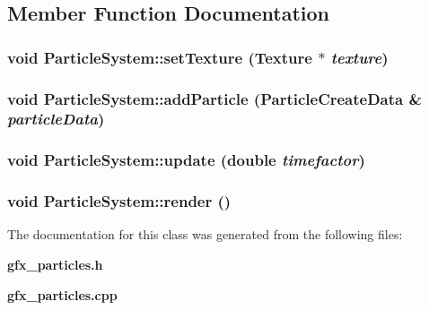 \subsection{Member Function Documentation}
\subsubsection{\setlength{\rightskip}{0pt plus 5cm}void ParticleSystem::setTexture ({\bf Texture} $\ast$ {\em texture})}\label{classEngine_1_1ParticleSystem_cac712d9cde95d9430b67b7f5b890c47}


\subsubsection{\setlength{\rightskip}{0pt plus 5cm}void ParticleSystem::addParticle ({\bf ParticleCreateData} \& {\em particleData})}\label{classEngine_1_1ParticleSystem_d0b29b761c4e1c31d4124ea36f38ba41}


\subsubsection{\setlength{\rightskip}{0pt plus 5cm}void ParticleSystem::update (double {\em timefactor})}\label{classEngine_1_1ParticleSystem_e43432a4c1a7f4b9b8587218c0a731ac}


\subsubsection{\setlength{\rightskip}{0pt plus 5cm}void ParticleSystem::render ()}\label{classEngine_1_1ParticleSystem_f2ec9e0fe49695569a9524f6a2238e6f}




The documentation for this class was generated from the following files:\begin{CompactItemize}
\item 
{\bf gfx\_\-particles.h}\item 
{\bf gfx\_\-particles.cpp}\end{CompactItemize}
